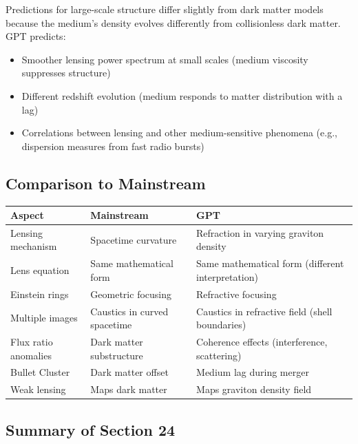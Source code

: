 \documentclass[12pt, a4paper]{article}
\begin{document}
Predictions for large-scale structure differ slightly from dark matter models because the medium's density evolves differently from collisionless dark matter. GPT predicts:
\begin{itemize}
    \item Smoother lensing power spectrum at small scales (medium viscosity suppresses structure)
    \item Different redshift evolution (medium responds to matter distribution with a lag)
    \item Correlations between lensing and other medium-sensitive phenomena (e.g., dispersion measures from fast radio bursts)
\end{itemize}

\subsection{Comparison to Mainstream}
\label{subsec:lensing_comparison}

\begin{center}
\begin{tabular}{|p{3.5cm}|p{5cm}|p{5cm}|}
\hline
\textbf{Aspect} & \textbf{Mainstream} & \textbf{GPT} \\
\hline
Lensing mechanism & Spacetime curvature & Refraction in varying graviton density \\
\hline
Lens equation & Same mathematical form & Same mathematical form (different interpretation) \\
\hline
Einstein rings & Geometric focusing & Refractive focusing \\
\hline
Multiple images & Caustics in curved spacetime & Caustics in refractive field (shell boundaries) \\
\hline
Flux ratio anomalies & Dark matter substructure & Coherence effects (interference, scattering) \\
\hline
Bullet Cluster & Dark matter offset & Medium lag during merger \\
\hline
Weak lensing & Maps dark matter & Maps graviton density field \\
\hline
\end{tabular}
\end{center}

\subsection{Summary of Section 24}
\label{subsec:summary_24}
\end{document}
